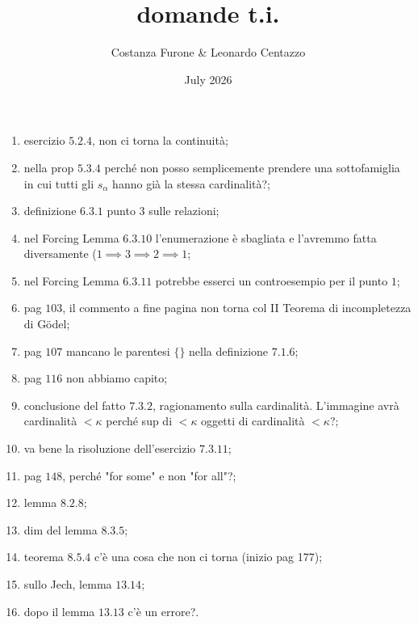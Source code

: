 \documentclass{book}
\title{domande t.i.}
\author{Costanza Furone & Leonardo Centazzo}
\date{July 2026}
\begin{document}
\begin{enumerate}
  \item esercizio $5.2.4$, non ci torna la continuità;
  \item nella prop $5.3.4$ perché non posso semplicemente prendere una sottofamiglia in cui tutti gli $s_\alpha$ hanno già la stessa cardinalità?;
  \item definizione $6.3.1$ punto $3$ sulle relazioni;
  \item nel Forcing Lemma $6.3.10$ l'enumerazione è sbagliata e l'avremmo fatta diversamente ($1 \implies 3 \implies 2 \implies 1$;
  \item nel Forcing Lemma $6.3.11$ potrebbe esserci un controesempio per il punto $1$;
  \item pag $103$, il commento a fine pagina non torna col II Teorema di incompletezza di Gödel;
  \item pag $107$ mancano le parentesi $\{ \}$ nella definizione $7.1.6$;
  \item pag $116$ non abbiamo capito;
  \item conclusione del fatto $7.3.2$, ragionamento sulla cardinalità. L'immagine avrà cardinalità $< \kappa$ perché sup di $< \kappa$ oggetti di cardinalità $< \kappa$?;
  \item va bene la risoluzione dell'esercizio $7.3.11$;
  \item pag $148$, perché "for some" e non "for all"?;
  \item lemma $8.2.8$;
  \item dim del lemma $8.3.5$;
  \item teorema $8.5.4$ c'è una cosa che non ci torna (inizio pag 177);
  \item sullo Jech, lemma $13.14$;
  \item dopo il lemma $13.13$ c'è un errore?.
\end{enumerate}
\end{document}
